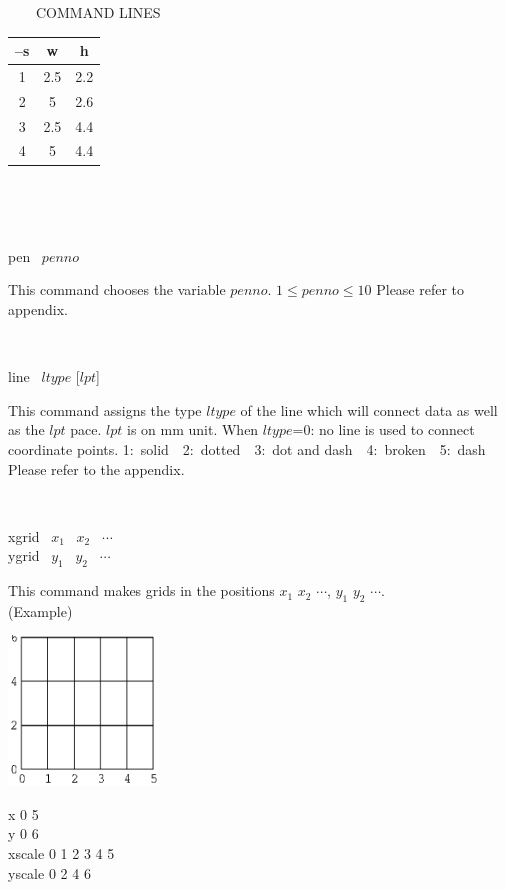 \begin{qsection}{\ ~~~COMMAND LINES}
\begin{minipage}[t]{9cm}
\begin{tabular}{ccc}
--{\bf s} &w &h  \\ \hline
1 &2.5 &2.2\\
2&5&2.6\\
3&2.5&4.4\\
4&5&4.4
\end{tabular}\\

\end{minipage}\\

\begin{minipage}[t]{5.5cm}
 pen ~$penno$
\end{minipage}
\begin{minipage}[t]{9cm}
This command chooses the variable $penno$.
$1 \leq  penno \leq 10$
Please refer to appendix.
\end{minipage}\\

\begin{minipage}[t]{5.5cm}
line ~$ltype$ [$lpt$]
\end{minipage}
\begin{minipage}[t]{9cm}
This command assigns the type $ltype$ of the line which will connect
data as well as the $lpt$ pace. $lpt$ is on mm unit.
When $ltype$=0: no line is used to connect coordinate points.
1:~solid~~2:~dotted~~3:~dot and dash~~4:~broken~~5:~dash
Please refer to the appendix.\\
        
\end{minipage}\\

\begin{minipage}[t]{5.5cm}
xgrid ~$x_1$ ~$x_2$ ~$\cdots$\\
ygrid ~$y_1$ ~$y_2$ ~$\cdots$
\end{minipage}
\begin{minipage}[t]{9cm}
This command makes grids in the positions $x_1$ $x_2$ $\cdots$,
$y_1$ $y_2$ $\cdots$.\\
(Example)\\
\begin{minipage}[t]{4.3cm}
 \includegraphics[width=4cm]{fig/grid.eps}
\end{minipage}
\begin{minipage}[b]{4.5cm}
\baselineskip 5pt
x 0 5\\
y 0 6\\
xscale 0 1 2 3 4 5\\
yscale 0 2 4 6


\end{minipage}
\end{minipage}
\end{qsection}
